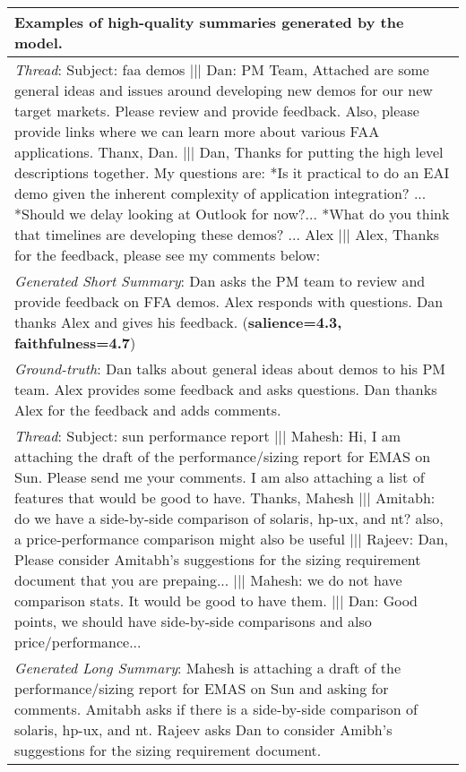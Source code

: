 \begin{table*}
\begin{center}
\small
\begin{tabular}{p{\textwidth}}
\toprule 
\textbf{Examples of high-quality summaries generated by the model.} \\
\midrule
\emph{Thread}: Subject: faa demos $\vert\vert\vert$ Dan: PM Team, Attached are some general ideas and issues around developing new demos for our new target markets. Please review and provide feedback. Also, please provide links where we can learn more about various FAA applications. Thanx, Dan. $\vert\vert\vert$ Dan, Thanks for putting the high level descriptions together. My questions are: *Is it practical to do an EAI demo given the inherent complexity of application integration? ... *Should we delay looking at Outlook for now?... *What do you think that timelines are developing these demos? ... Alex $\vert\vert\vert$ Alex, Thanks for the feedback, please see my comments below:\\
\emph{Generated Short Summary}: Dan asks the PM team to review and provide feedback on FFA demos. Alex responds with questions. Dan thanks Alex and gives his feedback. (\textbf{salience=4.3, faithfulness=4.7}) \\
\emph{Ground-truth}: Dan talks about general ideas about demos to his PM team. Alex provides some feedback and asks questions. Dan thanks Alex for the feedback and adds comments. \\
\midrule
\emph{Thread}: Subject: sun performance report $\vert\vert\vert$ Mahesh: Hi, I am attaching the draft of the performance/sizing report for EMAS on Sun. Please send me your comments. I am also attaching a list of features that would be good to have. Thanks, Mahesh $\vert\vert\vert$ Amitabh: do we have a side-by-side comparison of solaris, hp-ux, and nt? also, a price-performance comparison might also be useful  $\vert\vert\vert$ Rajeev: Dan, Please consider Amitabh's suggestions for the sizing requirement document that you are prepaing... $\vert\vert\vert$ Mahesh: we do not have comparison stats. It would be good to have them. $\vert\vert\vert$ Dan: Good points, we should have side-by-side comparisons and also price/performance...\\
\emph{Generated Long Summary}: Mahesh is attaching a draft of the performance/sizing report for EMAS on Sun and asking for comments.
Amitabh asks if there is a side-by-side comparison of solaris, hp-ux, and nt.
Rajeev asks Dan to consider Amibh's suggestions for the sizing requirement document.

\end{tabular}
\end{center}
\end{table*}
